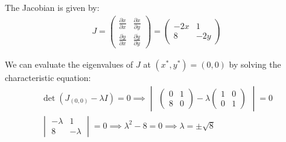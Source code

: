 \documentclass[12pt]{article}
\begin{document}
The Jacobian is given by:
\begin{align*}
    J = \begin{pmatrix}
            \frac{\partial \dot{x}}{\partial x} & \frac{\partial \dot{x}}{\partial y} \\
            \frac{\partial \dot{y}}{\partial x} & \frac{\partial \dot{y}}{\partial y}
        \end{pmatrix} = \begin{pmatrix}
                            -2x & 1   \\
                            8   & -2y
                        \end{pmatrix}
\end{align*}

We can evaluate the eigenvalues of $J$ at $(x^*,y^*) = (0,0)$ by solving the
characteristic equation:
\begin{align*}
    \det(J_{(0,0)} - \lambda I) = 0 \implies \begin{vmatrix}
                                                 \begin{pmatrix}
            0 & 1 \\
            8 & 0
        \end{pmatrix} - \lambda \begin{pmatrix}
                                    1 & 0 \\
                                    0 & 1
                                \end{pmatrix}
                                             \end{vmatrix} = 0 \\
    \begin{vmatrix}
        -\lambda & 1        \\
        8        & -\lambda
    \end{vmatrix} = 0 \implies \lambda^2 - 8 = 0 \implies \lambda = \pm \sqrt{8}
\end{align*}
\end{document}
